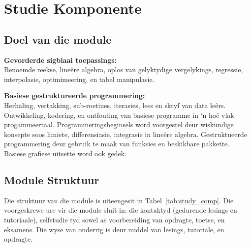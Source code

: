 \section{Studie Komponente}
    \subsection{Doel van die module}
        {\bf Gevorderde sigblaai toepassings:} \\
        Benoemde reekse, line\^{e}re algebra, oplos van gelyktydige
        vergelykings, regressie, interpolasie, optimimeering, en tabel
        manipulasie.

        \noindent
        {\bf Basiese gestruktureerde programmering:} \\
        Herhaling, vertakking, sub-roetines, iterasies, lees en skryf van data
        le\^{e}rs.  Ontwikkeling, kodering, en ontfouting van basiese programme
        in `n ho\"{e} vlak progammeertaal. Programmeringsbeginsels word
        voorgestel deur wiskundige konsepte soos limiete, differensiasie,
        integrasie in line\^{e}re algebra.  Gestruktueerde programmering deur
        gebruik te maak van funksies en beskikbare pakkette.  Basiese grafiese
        uitsette word ook gedek.

    \subsection{Module Struktuur}
        Die struktuur van die module is uiteengesit in
        Tabel~\ref{tab:study_comp}. Die voorgeskrewe ure vir die module sluit
        in: die kontaktyd (gedurende lesings en tutoriaale), selfstudie tyd
        sowel as voorbereiding van opdragte, toetse, en eksamens. Die wyse van
        onderrig is deur middel van lesings, tutoriale, en opdragte.

